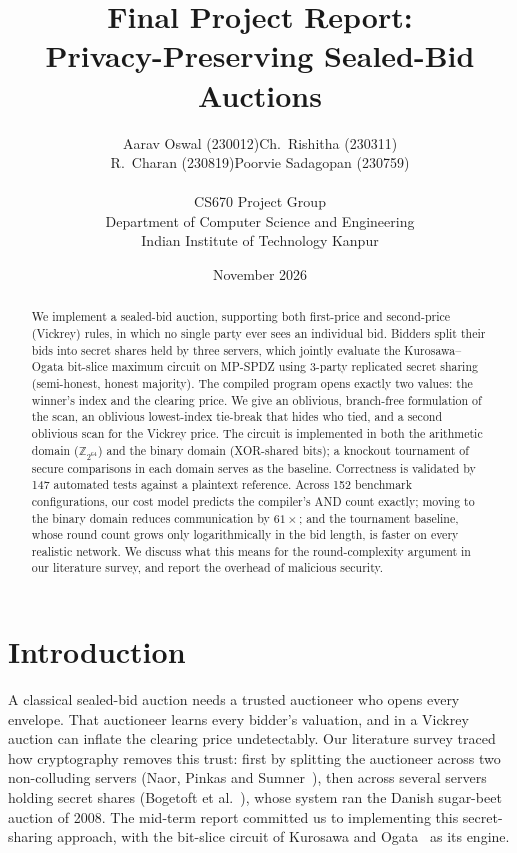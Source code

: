 \documentclass[11pt,a4paper]{article}
\title{\textbf{Final Project Report:}\\\textbf{Privacy-Preserving Sealed-Bid Auctions}}
\author{
  \begin{tabular}{cc}
    Aarav Oswal (230012) & Ch.\ Rishitha (230311)\\
    R.\ Charan (230819) & Poorvie Sadagopan (230759)
  \end{tabular}\\[10pt]
  CS670 Project Group\\
  Department of Computer Science and Engineering\\
  Indian Institute of Technology Kanpur
}
\date{November 2026}
\newcommand{\Z}{\mathbb{Z}}
\begin{document}
\maketitle

\begin{abstract}
We implement a sealed-bid auction, supporting both first-price and second-price (Vickrey) rules,
in which no single party ever sees an individual bid. Bidders split their bids into secret shares
held by three servers, which jointly evaluate the Kurosawa--Ogata bit-slice maximum circuit on
MP-SPDZ using 3-party replicated secret sharing (semi-honest, honest majority). The compiled program
opens exactly two values: the winner's index and the clearing price. We give an oblivious,
branch-free formulation of the scan, an oblivious lowest-index tie-break that hides who tied,
and a second oblivious scan for the Vickrey price. The circuit is implemented in both the
arithmetic domain ($\Z_{2^{64}}$) and the binary domain (XOR-shared bits); a knockout tournament of
secure comparisons in each domain serves as the baseline. Correctness is validated by 147
automated tests against a plaintext reference. Across 152 benchmark configurations, our cost model
predicts the compiler's AND count exactly; moving to the binary domain reduces communication by
$61\times$; and the tournament baseline, whose round count grows only logarithmically in the bid
length, is faster on every realistic network. We discuss what this means for the round-complexity
argument in our literature survey, and report the overhead of malicious security.
\end{abstract}

\section{Introduction}

A classical sealed-bid auction needs a trusted auctioneer who opens every envelope. That
auctioneer learns every bidder's valuation, and in a Vickrey auction can inflate the clearing price
undetectably. Our literature survey traced how cryptography removes this trust: first by splitting
the auctioneer across two non-colluding servers (Naor, Pinkas and Sumner~\cite{nps99}), then across
several servers holding secret shares (Bogetoft et al.~\cite{bogetoft06,bogetoft09}), whose system
ran the Danish sugar-beet auction of 2008. The mid-term report committed us to implementing this
secret-sharing approach, with the bit-slice circuit of Kurosawa and Ogata~\cite{ko02} as its engine.
\end{document}
